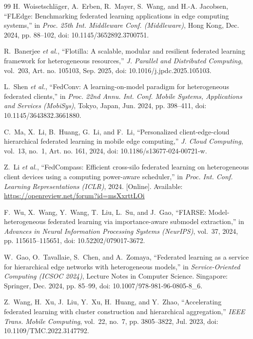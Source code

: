 \documentclass[conference]{IEEEtran}
\begin{document}
\begin{thebibliography}{99}
H.~Woisetschl\"{a}ger, A.~Erben, R.~Mayer, S.~Wang, and H.-A. Jacobsen, ``FLEdge: Benchmarking federated learning applications in edge computing systems,'' in \textit{Proc. 25th Int. Middleware Conf. (Middleware)}, Hong Kong, Dec. 2024, pp. 88--102, doi: 10.1145/3652892.3700751.

R.~Banerjee \textit{et al.}, ``Flotilla: A scalable, modular and resilient federated learning framework for heterogeneous resources,'' \textit{J. Parallel and Distributed Computing}, vol.~203, Art. no. 105103, Sep. 2025, doi: 10.1016/j.jpdc.2025.105103.

L.~Shen \textit{et al.}, ``FedConv: A learning-on-model paradigm for heterogeneous federated clients,'' in \textit{Proc. 22nd Annu. Int. Conf. Mobile Systems, Applications and Services (MobiSys)}, Tokyo, Japan, Jun. 2024, pp. 398--411, doi: 10.1145/3643832.3661880.

C.~Ma, X.~Li, B.~Huang, G.~Li, and F.~Li, ``Personalized client-edge-cloud hierarchical federated learning in mobile edge computing,'' \textit{J. Cloud Computing}, vol.~13, no.~1, Art. no. 161, 2024, doi: 10.1186/s13677-024-00721-w.

Z.~Li \textit{et al.}, ``FedCompass: Efficient cross-silo federated learning on heterogeneous client devices using a computing power-aware scheduler,'' in \textit{Proc. Int. Conf. Learning Representations (ICLR)}, 2024. [Online]. Available: \url{https://openreview.net/forum?id=msXxrttLOi}

F.~Wu, X.~Wang, Y.~Wang, T.~Liu, L.~Su, and J.~Gao, ``FIARSE: Model-heterogeneous federated learning via importance-aware submodel extraction,'' in \textit{Advances in Neural Information Processing Systems (NeurIPS)}, vol.~37, 2024, pp. 115615--115651, doi: 10.52202/079017-3672.

W.~Gao, O.~Tavallaie, S.~Chen, and A.~Zomaya, ``Federated learning as a service for hierarchical edge networks with heterogeneous models,'' in \textit{Service-Oriented Computing (ICSOC 2024)}, Lecture Notes in Computer Science. Singapore: Springer, Dec. 2024, pp. 85--99, doi: 10.1007/978-981-96-0805-8\_6.

Z.~Wang, H.~Xu, J.~Liu, Y.~Xu, H.~Huang, and Y.~Zhao, ``Accelerating federated learning with cluster construction and hierarchical aggregation,'' \textit{IEEE Trans. Mobile Computing}, vol.~22, no.~7, pp. 3805--3822, Jul. 2023, doi: 10.1109/TMC.2022.3147792.


\end{thebibliography}
\end{document}
